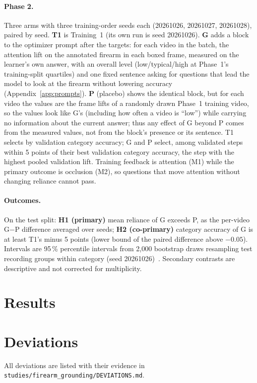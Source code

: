 \documentclass[11pt]{article}
\begin{document}
\paragraph{Phase 2.} Three arms with three training-order seeds each (20261026, 20261027, 20261028), paired by seed. \textbf{T1} is Training~1 (its own run is seed 20261026). \textbf{G} adds a block to the optimizer prompt after the targets: for each video in the batch, the attention lift on the annotated firearm in each boxed frame, measured on the learner's own answer, with an overall level (low/typical/high at Phase~1's training-split quartiles) and one fixed sentence asking for questions that lead the model to look at the firearm without lowering accuracy (Appendix~\ref{app:prompts}). \textbf{P} (placebo) shows the identical block, but for each video the values are the frame lifts of a randomly drawn Phase~1 training video, so the values look like G's (including how often a video is ``low'') while carrying no information about the current answer; thus any effect of G beyond P comes from the measured values, not from the block's presence or its sentence. T1 selects by validation category accuracy; G and P select, among validated steps within 5 points of their best validation category accuracy, the step with the highest pooled validation lift. Training feedback is attention (M1) while the primary outcome is occlusion (M2), so questions that move attention without changing reliance cannot pass.

\paragraph{Outcomes.} On the test split: \textbf{H1 (primary)} mean reliance of G exceeds P, as the per-video G$-$P difference averaged over seeds; \textbf{H2 (co-primary)} category accuracy of G is at least T1's minus 5 points (lower bound of the paired difference above $-0.05$). Intervals are 95\,\% percentile intervals from 2,000 bootstrap draws resampling test recording groups within category (seed 20261026)~\cite{efron1993bootstrap}. Secondary contrasts are descriptive and not corrected for multiplicity.

\section{Results}


\section{Deviations}\label{sec:deviations}
All deviations are listed with their evidence in \texttt{studies/firearm\_grounding/DEVIATIONS.md}.
\end{document}
